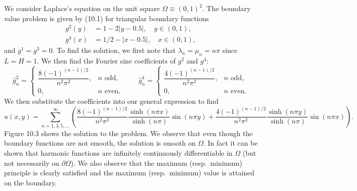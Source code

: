 
\begin{example}
    We consider Laplace's equation on the unit square $\Omega \equiv (0, 1)^2$. The boundary value problem is given by (10.1) for triangular boundary functions
    \begin{align*}
        g^2(y) &= 1 - 2|y - 0.5|, \quad y \in (0, 1), \\
        g^4(x) &= 1/2 - |x - 0.5|, \quad x \in (0, 1),
    \end{align*}
    and $g^1 = g^3 = 0$. To find the solution, we first note that $\lambda_n = \mu_n = n\pi$ since $L = H = 1$. We then find the Fourier sine coefficients of $g^2$ and $g^4$:
    \[\hat{g}_n^2 = \begin{cases} \dfrac{8(-1)^{(n-1)/2}}{n^2\pi^2}, & n \text{ odd}, \\ 0, & n \text{ even}, \end{cases} \qquad \hat{g}_n^4 = \begin{cases} \dfrac{4(-1)^{(n-1)/2}}{n^2\pi^2}, & n \text{ odd}, \\ 0, & n \text{ even}. \end{cases}\]
    We then substitute the coefficients into our general expression to find
    \[u(x, y) = \sum_{n=1,3,5,\dots}^{\infty} \left(\frac{8(-1)^{(n-1)/2}}{n^2\pi^2}\frac{\sinh(n\pi x)}{\sinh(n\pi)}\sin(n\pi y) + \frac{4(-1)^{(n-1)/2}}{n^2\pi^2}\frac{\sinh(n\pi y)}{\sinh(n\pi)}\sin(n\pi x)\right).\]
    Figure 10.3 shows the solution to the problem. We observe that even though the boundary functions are not smooth, the solution is smooth on $\Omega$. In fact it can be shown that harmonic functions are infinitely continuously differentiable in $\Omega$ (but not necessarily on $\partial\Omega$). We also observe that the maximum (resp.\ minimum) principle is clearly satisfied and the maximum (resp.\ minimum) value is attained on the boundary.

\end{example}

